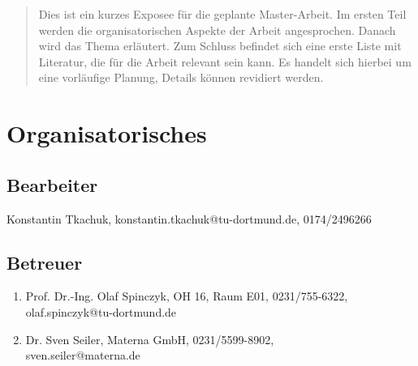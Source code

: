 \documentclass[12pt]{article}
\begin{document}
\maketitle

\begin{abstract}
Dies ist ein kurzes Exposee für die geplante Master-Arbeit. Im ersten Teil werden die organisatorischen Aspekte der Arbeit angesprochen. Danach wird das Thema erläutert. Zum Schluss befindet sich eine erste Liste mit Literatur, die für die Arbeit relevant sein kann.
Es handelt sich hierbei um eine vorläufige Planung, Details können revidiert werden. 
\end{abstract}

\section{Organisatorisches}
\subsection{Bearbeiter}

Konstantin Tkachuk, konstantin.tkachuk@tu-dortmund.de, 0174/2496266

\subsection{Betreuer}
\begin{enumerate}
	\item Prof. Dr.-Ing. Olaf Spinczyk, OH 16, Raum E01, 0231/755-6322,\\
olaf.spinczyk@tu-dortmund.de
	\item Dr. Sven Seiler, Materna GmbH, 0231/5599-8902,\\ sven.seiler@materna.de
\end{enumerate}
\end{document}
